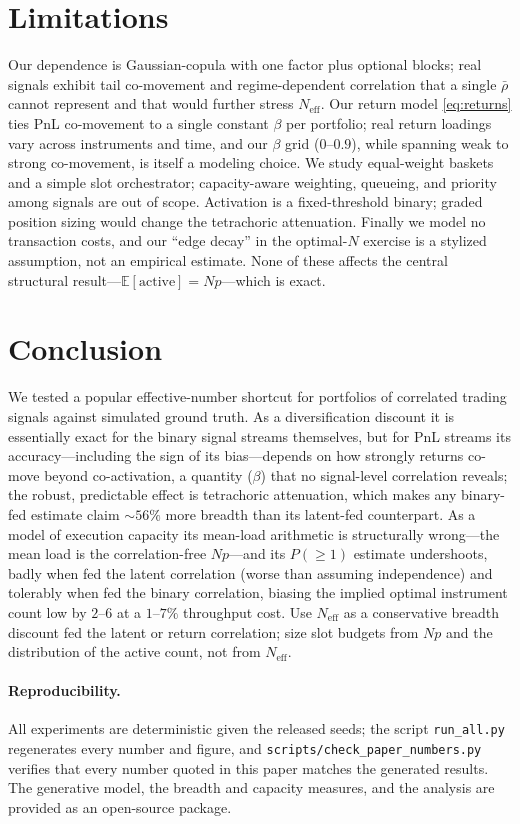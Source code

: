 \documentclass[11pt]{article}
\newcommand{\Neff}{N_{\mathrm{eff}}}
\newcommand{\rbar}{\bar{\rho}}
\begin{document}
\section{Limitations}

Our dependence is Gaussian-copula with one factor plus optional blocks; real
signals exhibit tail co-movement and regime-dependent correlation
\citep{cont2001empirical,embrechts2002correlation} that a single $\rbar$ cannot
represent and that would further stress $\Neff$. Our return model
\eqref{eq:returns} ties PnL co-movement to a single constant $\beta$ per
portfolio; real return loadings vary across instruments and time, and our
$\beta$ grid ($0$--$0.9$), while spanning weak to strong co-movement, is itself
a modeling choice. We study equal-weight baskets and a simple slot
orchestrator; capacity-aware weighting, queueing, and priority among signals
are out of scope. Activation is a fixed-threshold binary; graded position
sizing would change the tetrachoric attenuation. Finally we model no
transaction costs, and our ``edge decay'' in the optimal-$N$ exercise is a
stylized assumption, not an empirical estimate. None of these affects the
central structural result---$\mathbb{E}[\text{active}]=Np$---which is exact.

\section{Conclusion}

We tested a popular effective-number shortcut for portfolios of correlated trading
signals against simulated ground truth. As a diversification discount it is
essentially exact for the binary signal streams themselves, but for PnL streams
its accuracy---including the sign of its bias---depends on how strongly returns
co-move beyond co-activation, a quantity ($\beta$) that no signal-level
correlation reveals; the robust, predictable effect is tetrachoric attenuation,
which makes any binary-fed estimate claim ${\sim}56\%$ more breadth than its
latent-fed counterpart. As a model of execution capacity its mean-load
arithmetic is structurally wrong---the mean load is the correlation-free
$Np$---and its $P(\ge1)$ estimate undershoots, badly when fed the latent
correlation (worse than assuming independence) and tolerably when fed the
binary correlation, biasing the implied optimal instrument count low by
$2$--$6$ at a $1$--$7\%$ throughput cost. Use $\Neff$ as a conservative breadth
discount fed the latent or return correlation; size slot budgets from $Np$ and
the distribution of the active count, not from $\Neff$.

\paragraph{Reproducibility.} All experiments are deterministic given the released
seeds; the script \texttt{run\_all.py} regenerates every number and figure, and
\texttt{scripts/check\_paper\_numbers.py} verifies that every number quoted in
this paper matches the generated results. The generative model, the breadth and
capacity measures, and the analysis are provided as an open-source package.

\small


\end{document}
